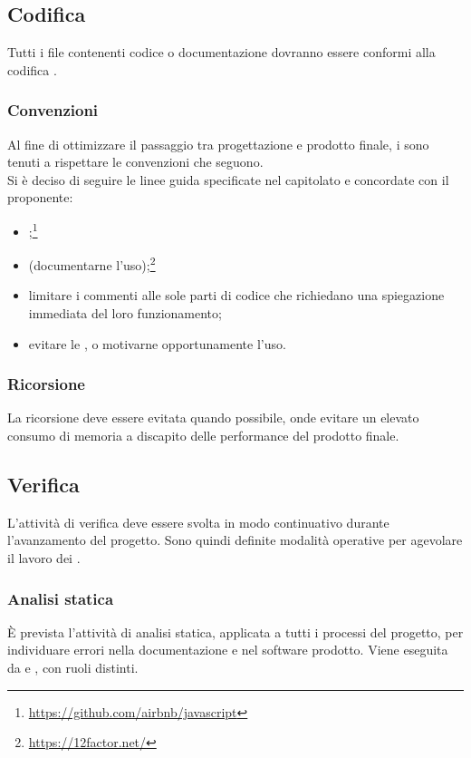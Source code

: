 \subsection{Codifica}
Tutti i file contenenti codice o documentazione dovranno essere conformi alla codifica .

\subsubsection{Convenzioni} \label{sec:convenzioni}
Al fine di ottimizzare il passaggio tra progettazione e prodotto finale, i \Programmatori{} sono tenuti a rispettare le convenzioni che seguono.\\
Si è deciso di seguire le linee guida specificate nel capitolato e concordate con il proponente:
\begin{itemize}
	\item {};\footnote{\url{https://github.com/airbnb/javascript}}
	\item {} (documentarne l'uso);\footnote{\url{https://12factor.net/}}
	\item limitare i commenti alle sole parti di codice che richiedano una spiegazione immediata del loro funzionamento;
	\item evitare le , o motivarne opportunamente l’uso.
\end{itemize}
\subsubsection{Ricorsione}
La ricorsione deve essere evitata quando possibile, onde evitare un elevato consumo di memoria a discapito delle performance del prodotto finale.

\subsection{Verifica}
L’attività di verifica deve essere svolta in modo continuativo durante l'avanzamento del progetto. Sono quindi definite modalità operative per agevolare il lavoro dei \Verificatori.

\subsubsection{Analisi statica}
\`{E} prevista l'attività di analisi statica, applicata a tutti i processi del progetto, per individuare errori nella documentazione e nel software prodotto. Viene eseguita da \Verificatori{} e \Programmatori{}, con ruoli distinti.

